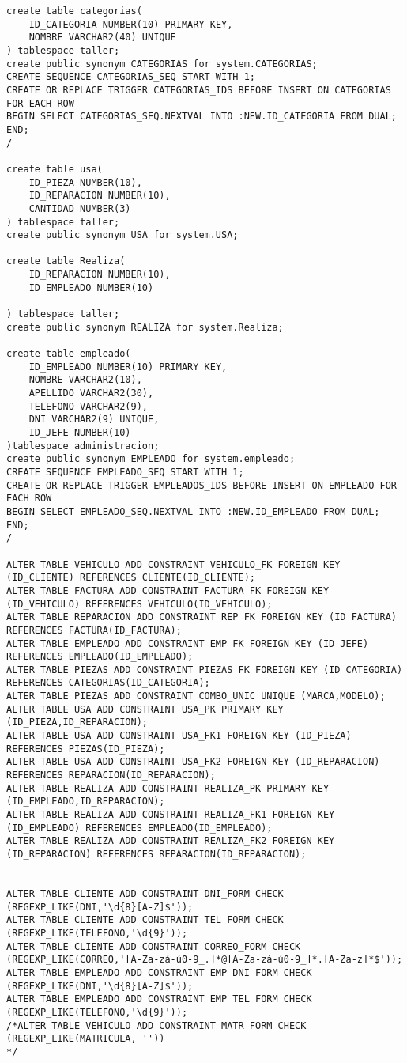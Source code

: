 \begin{lstlisting}[caption=Script .sql para crear la BD (BBDD)]
create table categorias(
    ID_CATEGORIA NUMBER(10) PRIMARY KEY,
    NOMBRE VARCHAR2(40) UNIQUE
) tablespace taller;
create public synonym CATEGORIAS for system.CATEGORIAS;
CREATE SEQUENCE CATEGORIAS_SEQ START WITH 1;
CREATE OR REPLACE TRIGGER CATEGORIAS_IDS BEFORE INSERT ON CATEGORIAS FOR EACH ROW
BEGIN SELECT CATEGORIAS_SEQ.NEXTVAL INTO :NEW.ID_CATEGORIA FROM DUAL;
END;
/

create table usa(
    ID_PIEZA NUMBER(10),
    ID_REPARACION NUMBER(10),
    CANTIDAD NUMBER(3)
) tablespace taller;
create public synonym USA for system.USA;

create table Realiza(
    ID_REPARACION NUMBER(10),
    ID_EMPLEADO NUMBER(10)

) tablespace taller;
create public synonym REALIZA for system.Realiza;

create table empleado(
    ID_EMPLEADO NUMBER(10) PRIMARY KEY,
    NOMBRE VARCHAR2(10),
    APELLIDO VARCHAR2(30),
    TELEFONO VARCHAR2(9),
    DNI VARCHAR2(9) UNIQUE,
    ID_JEFE NUMBER(10)
)tablespace administracion;
create public synonym EMPLEADO for system.empleado;
CREATE SEQUENCE EMPLEADO_SEQ START WITH 1;
CREATE OR REPLACE TRIGGER EMPLEADOS_IDS BEFORE INSERT ON EMPLEADO FOR EACH ROW
BEGIN SELECT EMPLEADO_SEQ.NEXTVAL INTO :NEW.ID_EMPLEADO FROM DUAL;
END;
/

ALTER TABLE VEHICULO ADD CONSTRAINT VEHICULO_FK FOREIGN KEY (ID_CLIENTE) REFERENCES CLIENTE(ID_CLIENTE);
ALTER TABLE FACTURA ADD CONSTRAINT FACTURA_FK FOREIGN KEY (ID_VEHICULO) REFERENCES VEHICULO(ID_VEHICULO);
ALTER TABLE REPARACION ADD CONSTRAINT REP_FK FOREIGN KEY (ID_FACTURA) REFERENCES FACTURA(ID_FACTURA);
ALTER TABLE EMPLEADO ADD CONSTRAINT EMP_FK FOREIGN KEY (ID_JEFE) REFERENCES EMPLEADO(ID_EMPLEADO);
ALTER TABLE PIEZAS ADD CONSTRAINT PIEZAS_FK FOREIGN KEY (ID_CATEGORIA) REFERENCES CATEGORIAS(ID_CATEGORIA);
ALTER TABLE PIEZAS ADD CONSTRAINT COMBO_UNIC UNIQUE (MARCA,MODELO);
ALTER TABLE USA ADD CONSTRAINT USA_PK PRIMARY KEY (ID_PIEZA,ID_REPARACION);
ALTER TABLE USA ADD CONSTRAINT USA_FK1 FOREIGN KEY (ID_PIEZA) REFERENCES PIEZAS(ID_PIEZA);
ALTER TABLE USA ADD CONSTRAINT USA_FK2 FOREIGN KEY (ID_REPARACION) REFERENCES REPARACION(ID_REPARACION);
ALTER TABLE REALIZA ADD CONSTRAINT REALIZA_PK PRIMARY KEY (ID_EMPLEADO,ID_REPARACION);
ALTER TABLE REALIZA ADD CONSTRAINT REALIZA_FK1 FOREIGN KEY (ID_EMPLEADO) REFERENCES EMPLEADO(ID_EMPLEADO);
ALTER TABLE REALIZA ADD CONSTRAINT REALIZA_FK2 FOREIGN KEY (ID_REPARACION) REFERENCES REPARACION(ID_REPARACION);


ALTER TABLE CLIENTE ADD CONSTRAINT DNI_FORM CHECK (REGEXP_LIKE(DNI,'\d{8}[A-Z]$'));
ALTER TABLE CLIENTE ADD CONSTRAINT TEL_FORM CHECK (REGEXP_LIKE(TELEFONO,'\d{9}'));
ALTER TABLE CLIENTE ADD CONSTRAINT CORREO_FORM CHECK (REGEXP_LIKE(CORREO,'[A-Za-zá-ú0-9_.]*@[A-Za-zá-ú0-9_]*.[A-Za-z]*$'));
ALTER TABLE EMPLEADO ADD CONSTRAINT EMP_DNI_FORM CHECK (REGEXP_LIKE(DNI,'\d{8}[A-Z]$'));
ALTER TABLE EMPLEADO ADD CONSTRAINT EMP_TEL_FORM CHECK (REGEXP_LIKE(TELEFONO,'\d{9}'));
/*ALTER TABLE VEHICULO ADD CONSTRAINT MATR_FORM CHECK (REGEXP_LIKE(MATRICULA, ''))
*/



\end{lstlisting}
